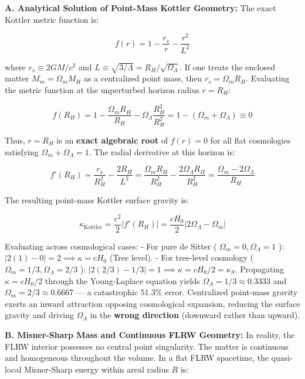 \documentclass[11pt,a4paper]{article}
\theoremstyle{definition}
\theoremstyle{remark}
\begin{document}
\textbf{A. Analytical Solution of Point-Mass Kottler Geometry:}
The exact Kottler metric function is:


\begin{equation}
f(r) = 1 - \frac{r_s}{r} - \frac{r^2}{L^2}
\end{equation}


where $r_s \equiv 2GM/c^2$ and $L \equiv \sqrt{3/\Lambda} = R_H / \sqrt{\Omega_\Lambda}$. If one treats the enclosed matter $M_m = \Omega_m M_H$ as a centralized point mass, then $r_s = \Omega_m R_H$. Evaluating the metric function at the unperturbed horizon radius $r = R_H$:


\begin{equation}
f(R_H) = 1 - \frac{\Omega_m R_H}{R_H} - \Omega_\Lambda \frac{R_H^2}{R_H^2} = 1 - (\Omega_m + \Omega_\Lambda) \equiv 0
\end{equation}


Thus, $r = R_H$ is an \textbf{exact algebraic root} of $f(r) = 0$ for all flat cosmologies satisfying $\Omega_m + \Omega_\Lambda = 1$. The radial derivative at this horizon is:


\begin{equation}
f'(R_H) = \frac{r_s}{R_H^2} - \frac{2 R_H}{L^2} = \frac{\Omega_m R_H}{R_H^2} - \frac{2 \Omega_\Lambda R_H}{R_H^2} = \frac{\Omega_m - 2\Omega_\Lambda}{R_H}
\end{equation}


The resulting point-mass Kottler surface gravity is:


\begin{equation}
\kappa_{\text{Kottler}} = \frac{c^2}{2} |f'(R_H)| = \frac{c H_0}{2} |2\Omega_\Lambda - \Omega_m|
\end{equation}


Evaluating across cosmological cases:
- For pure de Sitter ( $\Omega_m = 0, \Omega_\Lambda = 1$ ): $|2(1) - 0| = 2 \implies \kappa = c H_0$ (Tree level).
- For tree-level cosmology ( $\Omega_m = 1/3, \Omega_\Lambda = 2/3$ ): $|2(2/3) - 1/3| = 1 \implies \kappa = c H_0 / 2 = \kappa_S$.
Propagating $\kappa = c H_0 / 2$ through the Young-Laplace equation yields $\Omega_\Lambda = 1/3 \approx 0.3333$ and $\Omega_m = 2/3 \approx 0.6667$ — a catastrophic $51.3\%$ error. Centralized point-mass gravity exerts an inward attraction opposing cosmological expansion, reducing the surface gravity and driving $\Omega_\Lambda$ in the \textbf{wrong direction} (downward rather than upward).

\textbf{B. Misner-Sharp Mass and Continuous FLRW Geometry:}
In reality, the FLRW interior possesses no central point singularity. The matter is continuous and homogeneous throughout the volume. In a flat FLRW spacetime, the quasi-local Misner-Sharp energy within areal radius $R$ is:
\end{document}
